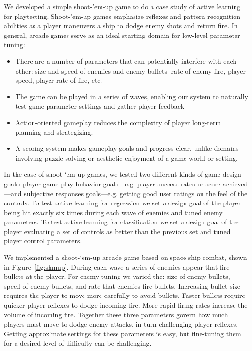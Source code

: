 \documentclass{sig-alternate}
\begin{document}
We developed a simple shoot-'em-up game to do a case study of active learning for playtesting.
Shoot-'em-up games emphasize reflexes and pattern recognition abilities as a player maneuvers a ship to dodge enemy shots and return fire.
%
In general, arcade games serve as an ideal starting domain for low-level parameter tuning:
\begin{itemize}
\item There are a number of parameters that can potentially interfere with each other: size and speed of enemies and enemy bullets, rate of enemy fire, player speed, player rate of fire, etc.
\item The game can be played in a series of waves, enabling our system to naturally test game parameter settings and gather player feedback.
\item Action-oriented gameplay reduces the complexity of player long-term planning and strategizing.
\item A scoring system makes gameplay goals and progress clear, unlike domains involving puzzle-solving or aesthetic enjoyment of a game world or setting.
\end{itemize}
%
In the case of shoot-`em-up games, we tested two different kinds of game design goals: player game play behavior goals---e.g. player success rates or score achieved---and subjective responses goals---e.g. getting good user ratings on the feel of the controls.
To test active learning for regression we set a design goal of the player being hit exactly six times during each wave of enemies and tuned enemy parameters.
To test active learning for classification we set a design goal of the player evaluating a set of controls as better than the previous set and tuned player control parameters.

We implemented a shoot-`em-up arcade game based on space ship combat, shown in Figure~\ref{fig:shmup}.
During each wave a series of enemies appear that fire bullets at the player. 
For enemy tuning we varied the: size of enemy bullets, speed of enemy bullets, and rate that enemies fire bullets. 
Increasing bullet size requires the player to move more carefully to avoid bullets. 
Faster bullets require quicker player reflexes to dodge incoming fire. 
More rapid firing rates increase the volume of incoming fire. 
Together these three parameters govern how much players must move to dodge enemy attacks, in turn challenging player reflexes. 
Getting approximate settings for these parameters is easy, but fine-tuning them for a desired level of difficulty can be challenging. 
\end{document}
